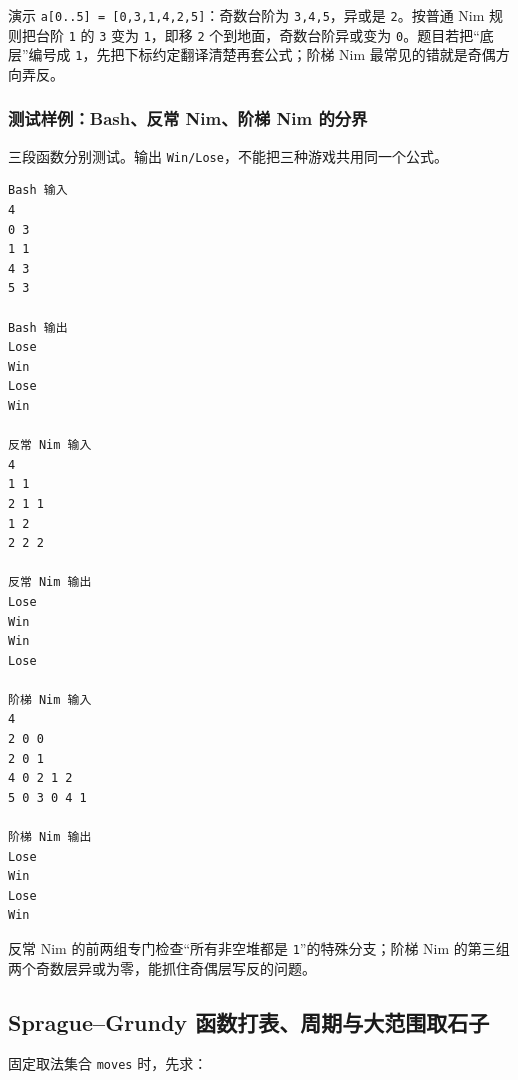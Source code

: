 演示 \passthrough{\lstinline!a[0..5] = [0,3,1,4,2,5]!}：奇数台阶为 \passthrough{\lstinline!3,4,5!}，异或是 \passthrough{\lstinline!2!}。按普通 Nim 规则把台阶 \passthrough{\lstinline!1!} 的 \passthrough{\lstinline!3!} 变为 \passthrough{\lstinline!1!}，即移 \passthrough{\lstinline!2!} 个到地面，奇数台阶异或变为 \passthrough{\lstinline!0!}。题目若把``底层''编号成 \passthrough{\lstinline!1!}，先把下标约定翻译清楚再套公式；阶梯 Nim 最常见的错就是奇偶方向弄反。

\subsubsection{测试样例：Bash、反常 Nim、阶梯 Nim 的分界}

三段函数分别测试。输出 \passthrough{\lstinline!Win/Lose!}，不能把三种游戏共用同一个公式。

\begin{lstlisting}
Bash 输入
4
0 3
1 1
4 3
5 3

Bash 输出
Lose
Win
Lose
Win

反常 Nim 输入
4
1 1
2 1 1
1 2
2 2 2

反常 Nim 输出
Lose
Win
Win
Lose

阶梯 Nim 输入
4
2 0 0
2 0 1
4 0 2 1 2
5 0 3 0 4 1

阶梯 Nim 输出
Lose
Win
Lose
Win
\end{lstlisting}

反常 Nim 的前两组专门检查``所有非空堆都是 \passthrough{\lstinline!1!}''的特殊分支；阶梯 Nim 的第三组两个奇数层异或为零，能抓住奇偶层写反的问题。


\subsection{Sprague--Grundy 函数打表、周期与大范围取石子}

固定取法集合 \passthrough{\lstinline!moves!} 时，先求：

